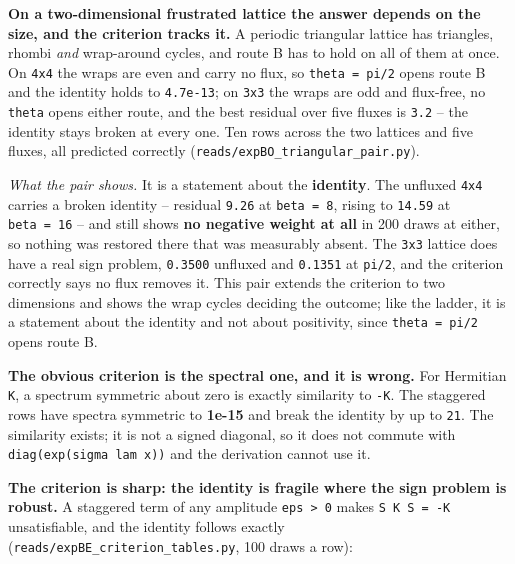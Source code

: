 \documentclass[10pt,letterpaper,twocolumn]{article}
\begin{document}
\textbf{On a two-dimensional frustrated lattice the answer depends on the size, and the criterion tracks
it.} A periodic triangular lattice has triangles, rhombi \emph{and} wrap-around cycles, and route B has
to hold on all of them at once. On \texttt{4x4} the wraps are even and carry no flux, so \texttt{theta\ =\allowbreak{}\ pi/\allowbreak{}2}
opens route B and the identity holds to \texttt{4.\allowbreak{}7e-{}\allowbreak{}13}; on \texttt{3x3} the wraps are odd and flux-free, no
\texttt{theta} opens either route, and the best residual over five fluxes is \texttt{3.\allowbreak{}2} -- the identity stays
broken at every one. Ten rows across the two lattices and five fluxes, all predicted correctly
(\texttt{reads/\allowbreak{}expBO\_\allowbreak{}triangular\_\allowbreak{}pair.\allowbreak{}py}).

\emph{What the pair shows.} It is a statement about the \textbf{identity}. The unfluxed \texttt{4x4} carries a broken
identity -- residual \texttt{9.\allowbreak{}26} at \texttt{beta\ =\allowbreak{}\ 8}, rising to \texttt{14.\allowbreak{}59} at \texttt{beta\ =\allowbreak{}\ 16} -- and still shows \textbf{no
negative weight at all} in 200 draws at either, so nothing was restored there that was measurably
absent. The \texttt{3x3} lattice does have a real sign problem, \texttt{0.\allowbreak{}3500} unfluxed and \texttt{0.\allowbreak{}1351} at \texttt{pi/\allowbreak{}2},
and the criterion correctly says no flux removes it. This pair extends the criterion to two
dimensions and
shows the wrap cycles deciding the outcome; like the ladder, it is a statement about the identity
and not about positivity, since \texttt{theta\ =\allowbreak{}\ pi/\allowbreak{}2} opens route B.

\textbf{The obvious criterion is the spectral one, and it is wrong.} For Hermitian \texttt{K}, a spectrum
symmetric about zero is exactly similarity to \texttt{-{}\allowbreak{}K}. The staggered rows have spectra symmetric to
\textbf{1e-15} and break the identity by up to \texttt{21}. The similarity exists; it is not a signed diagonal,
so it does not commute with \texttt{diag(\allowbreak{}exp(\allowbreak{}sigma\ lam\ x)\allowbreak{})\allowbreak{}} and the derivation cannot use it.

\textbf{The criterion is sharp: the identity is fragile where the sign problem is robust.} A staggered
term of any amplitude \texttt{eps\ \textgreater{}\allowbreak{}\ 0} makes \texttt{S\ K\ S\ =\allowbreak{}\ -{}\allowbreak{}K} unsatisfiable, and the identity follows exactly
(\texttt{reads/\allowbreak{}expBE\_\allowbreak{}criterion\_\allowbreak{}tables.\allowbreak{}py}, 100 draws a row):
\end{document}
